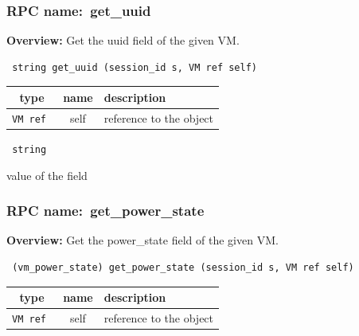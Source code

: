 \subsubsection{RPC name:~get\_uuid}

{\bf Overview:} 
Get the uuid field of the given VM.

\begin{verbatim} string get_uuid (session_id s, VM ref self)\end{verbatim}



 
\vspace{0.3cm}
\begin{tabular}{|c|c|p{7cm}|}
 \hline
{\bf type} & {\bf name} & {\bf description} \\ \hline
{\tt VM ref } & self & reference to the object \\ \hline 

\end{tabular}

\vspace{0.3cm}

{\tt 
string
}


value of the field
\vspace{0.3cm}
\vspace{0.3cm}
\vspace{0.3cm}
\subsubsection{RPC name:~get\_power\_state}

{\bf Overview:} 
Get the power\_state field of the given VM.

\begin{verbatim} (vm_power_state) get_power_state (session_id s, VM ref self)\end{verbatim}



 
\vspace{0.3cm}
\begin{tabular}{|c|c|p{7cm}|}
 \hline
{\bf type} & {\bf name} & {\bf description} \\ \hline
{\tt VM ref } & self & reference to the object \\ \hline 

\end{tabular}

\vspace{0.3cm}

